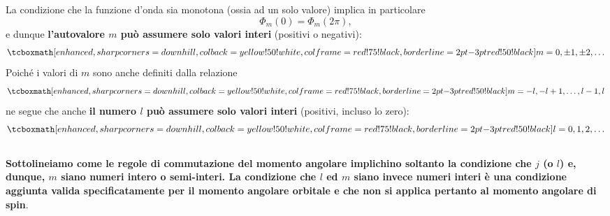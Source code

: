 \documentclass[a4paper,12pt,oneside]{book}
\begin{document}
La condizione che la funzione d'onda sia monotona (ossia ad un solo valore) implica in particolare
	\begin{equation}
		\Phi _m (0) =\Phi _m (2\pi ) ,
	\label{eq:cap17_10}
	\end{equation}
e dunque \textbf{l'autovalore $m$ può assumere solo valori interi} (positivi o negativi):
	\begin{equation}
		\tcboxmath[enhanced, sharp corners=downhill, colback=yellow!50!white, colframe=red!75!black, borderline={2pt}{-3pt}{red!50!black}]{
			m= 0, \pm 1,\pm 2, \dots
			}
	\end{equation}
Poiché i valori di $m$ sono anche definiti dalla relazione
	\begin{equation}
		\tcboxmath[enhanced, sharp corners=downhill, colback=yellow!50!white, colframe=red!75!black, borderline={2pt}{-3pt}{red!50!black}]{
			m = -l, -l+1,\dots, l-1,l
			}
	\end{equation}
ne segue che anche \textbf{il numero $l$ può assumere solo valori interi} (positivi, incluso lo zero):
	\begin{equation}
		\tcboxmath[enhanced, sharp corners=downhill, colback=yellow!50!white, colframe=red!75!black, borderline={2pt}{-3pt}{red!50!black}]{
			l= 0,1,2,\dots
			}
	\end{equation}\\
	
\textbf{Sottolineiamo come le regole di commutazione del momento angolare implichino soltanto la condizione che $j$ (o $l$) e, dunque, $m$  siano numeri intero o semi-interi. La condizione che $l$ ed $m$ siano invece numeri interi è una condizione aggiunta valida specificatamente per il momento angolare orbitale e che non si applica pertanto al momento angolare di spin}.\\
\end{document}
